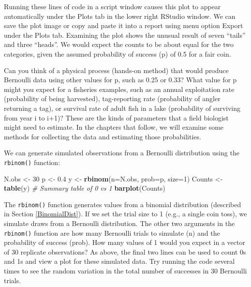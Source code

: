 \documentclass[
]{krantz}
\makeatletter
\newenvironment{Shaded}{\begin{snugshade}}{\end{snugshade}}
\newcommand{\AttributeTok}[1]{\textcolor[rgb]{0.27,0.27,0.27}{#1}}
\newcommand{\CommentTok}[1]{\textcolor[rgb]{0.37,0.37,0.37}{\textit{#1}}}
\newcommand{\DecValTok}[1]{\textcolor[rgb]{0.06,0.06,0.06}{#1}}
\newcommand{\FloatTok}[1]{\textcolor[rgb]{0.06,0.06,0.06}{#1}}
\newcommand{\FunctionTok}[1]{\textcolor[rgb]{0.27,0.27,0.27}{\textbf{#1}}}
\newcommand{\NormalTok}[1]{#1}
\newcommand{\OtherTok}[1]{\textcolor[rgb]{0.37,0.37,0.37}{#1}}
\newenvironment{kframe}{%
\medskip{}
\setlength{\fboxsep}{.8em}
 \def\at@end@of@kframe{}%
 \ifinner\ifhmode%
  \def\at@end@of@kframe{\end{minipage}}%
  \begin{minipage}{\columnwidth}%
 \fi\fi%
 \def\FrameCommand##1{\hskip\@totalleftmargin \hskip-\fboxsep
 \colorbox{shadecolor}{##1}\hskip-\fboxsep
     \hskip-\linewidth \hskip-\@totalleftmargin \hskip\columnwidth}%
 \MakeFramed {\advance\hsize-\width
   \@totalleftmargin\z@ \linewidth\hsize
   \@setminipage}}%
 {\par\unskip\endMakeFramed%
 \at@end@of@kframe}
\renewenvironment{Shaded}{\begin{kframe}}{\end{kframe}}
\makeatother
\begin{document}
Running these lines of code in a script window causes this plot to appear automatically under the Plots tab in the lower right RStudio window. We can save the plot image or copy and paste it into a report using menu option Export under the Plots tab. Examining the plot shows the unusual result of seven ``tails'' and three ``heads''. We would expect the counts to be about equal for the two categories, given the assumed probability of success (p) of 0.5 for a fair coin.

Can you think of a physical process (hands-on method) that would produce Bernoulli data using other values for p, such as 0.25 or 0.33? What value for p might you expect for a fisheries examples, such as an annual exploitation rate (probability of being harvested), tag-reporting rate (probability of angler returning a tag), or survival rate of adult fish in a lake (probability of surviving from year i to i+1)? These are the kinds of parameters that a field biologist might need to estimate. In the chapters that follow, we will examine some methods for collecting the data and estimating those probabilities.

We can generate simulated observations from a Bernoulli distribution using the \texttt{rbinom()} function:

\begin{Shaded}
\begin{Highlighting}[]
\NormalTok{N.obs }\OtherTok{\textless{}{-}} \DecValTok{30}
\NormalTok{p }\OtherTok{\textless{}{-}} \FloatTok{0.4}
\NormalTok{y }\OtherTok{\textless{}{-}} \FunctionTok{rbinom}\NormalTok{(}\AttributeTok{n=}\NormalTok{N.obs, }\AttributeTok{prob=}\NormalTok{p, }\AttributeTok{size=}\DecValTok{1}\NormalTok{)}
\NormalTok{Counts }\OtherTok{\textless{}{-}} \FunctionTok{table}\NormalTok{(y)  }\CommentTok{\# Summary table of 0 vs 1}
\FunctionTok{barplot}\NormalTok{(Counts)}
\end{Highlighting}
\end{Shaded}

The \texttt{rbinom()} function generates values from a binomial distribution (described in Section \ref{BinomialDist}). If we set the trial size to 1 (e.g., a single coin toss), we simulate draws from a Bernoulli distribution. The other two arguments in the \texttt{rbinom()} function are how many Bernoulli trials to simulate (n) and the probability of success (prob). How many values of 1 would you expect in a vector of 30 replicate observations? As above, the final two lines can be used to count 0s and 1s and view a plot for these simulated data. Try running the code several times to see the random variation in the total number of successes in 30 Bernoulli trials.
\end{document}
